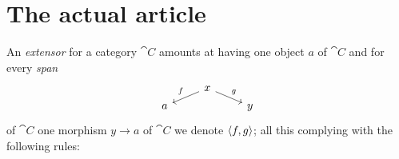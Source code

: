 
\section{The actual article}


An {\em extensor}  for a category \(\cat C\) amounts at having one object \(a\) of \(\cat C\) and for every {\em span}
\[\begin{tikzcd}[row sep=tiny]
& x \ar["f", dl, swap] \ar["g", dr] & \\
a & & y
\end{tikzcd}\]
of \(\cat C\) one morphism \(y \to a\) of \(\cat C\) we denote \(\left\langle f, g\right\rangle\); all this complying with the following rules:
